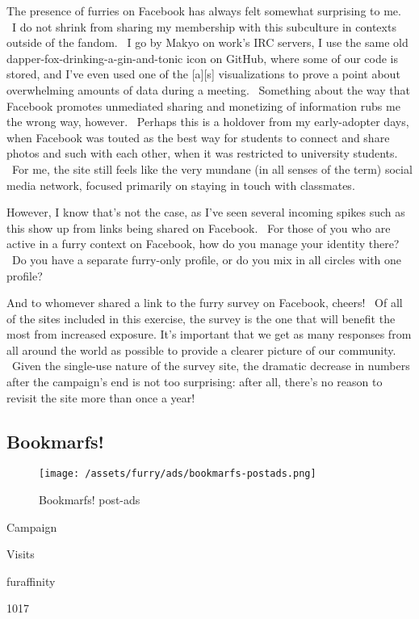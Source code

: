 The presence of furries on Facebook has always felt somewhat surprising
to me. ~I do not shrink from sharing my membership with this subculture
in contexts outside of the fandom. ~I go by Makyo on work's IRC servers,
I use the same old dapper-fox-drinking-a-gin-and-tonic icon on GitHub,
where some of our code is stored, and I've even used one of the
{[}a{]}{[}s{]} visualizations to prove a point about overwhelming
amounts of data during a meeting. ~Something about the way that Facebook
promotes unmediated sharing and monetizing of information rubs me the
wrong way, however. ~Perhaps this is a holdover from my early-adopter
days, when Facebook was touted as the best way for students to connect
and share photos and such with each other, when it was restricted to
university students. ~For me, the site still feels like the very mundane
(in all senses of the term) social media network, focused primarily on
staying in touch with classmates.

However, I know that's not the case, as I've seen several incoming
spikes such as this show up from links being shared on Facebook. ~For
those of you who are active in a furry context on Facebook, how do you
manage your identity there? ~Do you have a separate furry-only profile,
or do you mix in all circles with one profile?

And to whomever shared a link to the furry survey on Facebook, cheers!
~Of all of the sites included in this exercise, the survey is the one
that will benefit the most from increased exposure. It's important that
we get as many responses from all around the world as possible to
provide a clearer picture of our community. ~Given the single-use nature
of the survey site, the dramatic decrease in numbers after the
campaign's end is not too surprising: after all, there's no reason to
revisit the site more than once a year!

\subsection{Bookmarfs!}\label{bookmarfs}

\begin{figure}[htbp]
\centering
\texttt{[image: /assets/furry/ads/bookmarfs-postads.png]}
\caption{Bookmarfs! post-ads}
\end{figure}

Campaign

Visits

furaffinity

1017

